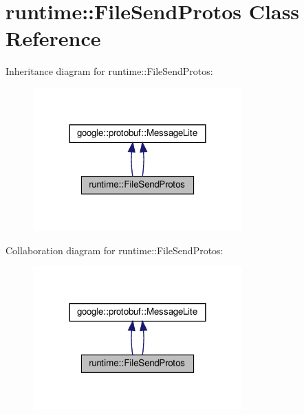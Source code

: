 \hypertarget{classruntime_1_1FileSendProtos}{}\section{runtime\+:\+:File\+Send\+Protos Class Reference}
\label{classruntime_1_1FileSendProtos}


Inheritance diagram for runtime\+:\+:File\+Send\+Protos\+:
\nopagebreak
\begin{figure}[H]
\begin{center}
\leavevmode
\includegraphics[width=228pt]{classruntime_1_1FileSendProtos__inherit__graph}
\end{center}
\end{figure}


Collaboration diagram for runtime\+:\+:File\+Send\+Protos\+:
\nopagebreak
\begin{figure}[H]
\begin{center}
\leavevmode
\includegraphics[width=228pt]{classruntime_1_1FileSendProtos__coll__graph}
\end{center}
\end{figure}
